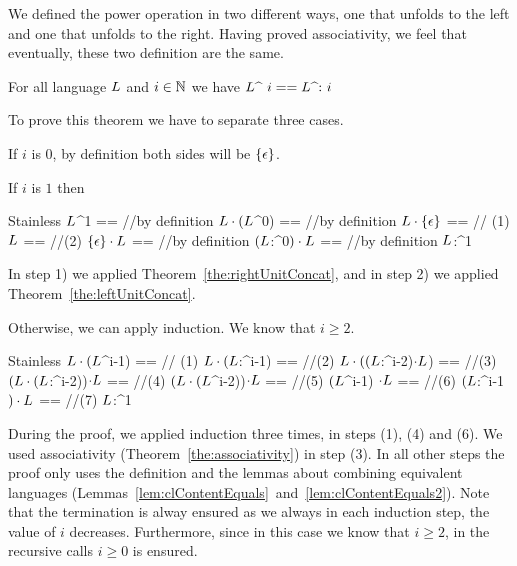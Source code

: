We defined the power operation in two different ways, one that unfolds to the left and one that unfolds to the right. Having proved associativity, we feel that eventually, these two definition are the same.


\begin{theorem}
	\label{the:couldHaveDefinedOtherWay}
	For all language $L$ and $i \in \mathbb{N}$ we have $L \text{\textasciicircum~} i == L \text{\textasciicircum:~} i$
\end{theorem}

To prove this theorem we have to separate three cases.

If $i$ is $0$, by definition both sides will be $\{\epsilon\}$.

If $i$ is $1$ then 
\begin{ShortCode}{Stainless}
 $L$^1 == //by definition
 $L \cdot (L$^0) == //by definition
 $L \cdot \{\epsilon\}$ == // (1)
 $L$ == //(2)
 $\{\epsilon\} \cdot L$ == //by definition
 $(L$:^0$) \cdot L$ == //by definition
 $L$:^1
\end{ShortCode}

In step 1) we applied Theorem~\ref{the:rightUnitConcat}, and in step 2) we applied Theorem~\ref{the:leftUnitConcat}.

Otherwise, we can apply induction. We know that $i \ge 2$.

\begin{ShortCode}{Stainless}
 $L \cdot (L$^i-1) == // (1) 
 $L \cdot (L$:^i-1) == //(2)
 $L \cdot ((L$:^i-2)$\cdot L$) == //(3)
 $(L \cdot (L$:^i-2))$\cdot L$ == //(4)
 $(L \cdot (L$^i-2))$\cdot L$ == //(5)
 $(L$^i-1) $\cdot L$ == //(6)
 $(L$:^i-1$) \cdot L$ ==  //(7)
 $L$:^1
\end{ShortCode}

During the proof, we applied induction three times, in steps (1), (4) and (6). We used associativity (Theorem~\ref{the:associativity}) in step (3). In all other steps the proof only uses the definition and the lemmas about combining equivalent languages (Lemmas~\ref{lem:clContentEquals}~and~\ref{lem:clContentEquals2}). Note that the termination is alway ensured as we always in each induction step, the value of $i$ decreases. Furthermore, since in this case we know that $i \ge 2$, in the recursive calls $i \ge 0$ is ensured.

